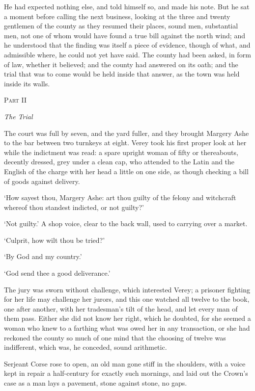 \documentclass[11pt]{article}
\newcommand{\partheading}[2]{%
  \clearpage
  \vspace*{5\baselineskip}
  {\centering
   {\large\scshape Part #1}\par
   \vspace{0.6\baselineskip}
   {\Large\itshape #2}\par}
  \vspace{2.5\baselineskip}\noindent}
\begin{document}
He had expected nothing else, and told himself so, and made his note. But he sat a moment before calling the next business, looking at the three and twenty gentlemen of the county as they resumed their places, sound men, substantial men, not one of whom would have found a true bill against the north wind; and he understood that the finding was itself a piece of evidence, though of what, and admissible where, he could not yet have said. The county had been asked, in form of law, whether it believed; and the county had answered on its oath; and the trial that was to come would be held inside that answer, as the town was held inside its walls.

\partheading{II}{The Trial}
\noindent The court was full by seven, and the yard fuller, and they brought Margery Ashe to the bar between two turnkeys at eight. Verey took his first proper look at her while the indictment was read: a spare upright woman of fifty or thereabouts, decently dressed, grey under a clean cap, who attended to the Latin and the English of the charge with her head a little on one side, as though checking a bill of goods against delivery.

`How sayest thou, Margery Ashe: art thou guilty of the felony and witchcraft whereof thou standest indicted, or not guilty?'

`Not guilty.' A shop voice, clear to the back wall, used to carrying over a market.

`Culprit, how wilt thou be tried?'

`By God and my country.'

`God send thee a good deliverance.'

The jury was sworn without challenge, which interested Verey; a prisoner fighting for her life may challenge her jurors, and this one watched all twelve to the book, one after another, with her tradesman's tilt of the head, and let every man of them pass. Either she did not know her right, which he doubted, for she seemed a woman who knew to a farthing what was owed her in any transaction, or she had reckoned the county so much of one mind that the choosing of twelve was indifferent, which was, he conceded, sound arithmetic.

Serjeant Corse rose to open, an old man gone stiff in the shoulders, with a voice kept in repair a half-century for exactly such mornings, and laid out the Crown's case as a man lays a pavement, stone against stone, no gaps.
\end{document}
